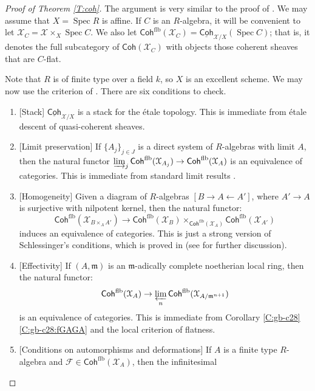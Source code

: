 \documentclass[a4paper]{amsart}
\theoremstyle{plain}
\theoremstyle{definition}
\theoremstyle{remark}
\numberwithin{equation}{section}
\newcommand\cX{\mathcal{X}}
\newcommand\Coh{\mathsf{Coh}}
\DeclareMathOperator{\Spec}{Spec}
\newcommand{\itemref}[1]{\eqref{#1}}
\newcommand{\shv}[1]{\mathcal{{#1}}}
\begin{document}
\begin{proof} [Proof of Theorem \ref{T:coh}]
  The argument is very similar to the proof of
  \cite[Thm.~8.1]{hallj_openness_coh}. We may assume that $X=\Spec R$
  is affine. If $C$ is an $R$-algebra, it will be convenient to let
  $\cX_C = \cX\times_X \Spec C$. We also let
  $\Coh^{\mathrm{flb}}(\cX_C)=\underline{\Coh}_{\cX/X}(\Spec C)$;
  that is, it denotes the full subcategory of $\Coh(\cX_C)$ with
  objects those coherent sheaves that are $C$-flat.

  Note that $R$ is of finite type over a field $k$, so $X$ is an
  excellent scheme.  We may now use the criterion of
  \cite[Thm.~A]{hallj_openness_coh}. There are six conditions to
  check.
  \begin{enumerate}
  \item {[Stack]} $\underline{\Coh}_{\cX/X}$ is a stack for the \'etale
    topology. This is immediate from \'etale descent of quasi-coherent
    sheaves.
  \item {[Limit preservation]} If $\{A_j\}_{j\in J}$ is a direct system
    of $R$-algebras with limit $A$, then the natural functor
    $\varinjlim_j \Coh^{\mathrm{flb}}(\cX_{A_j}) \to
    \Coh^{\mathrm{flb}}(\cX_A)$ is an equivalence of
    categories. This is immediate from standard limit results \cite[\S\S IV.8, IV.11]{EGA}. 
  \item {[Homogeneity]} Given a diagram of $R$-algebras
    $[B \to A \leftarrow A']$, where $A' \to A$ is surjective with
    nilpotent kernel, then the natural functor:
    \[
      \Coh^{\mathrm{flb}}(\cX_{B \times_A A'}) \to {\Coh}^{\mathrm{flb}}(\cX_B) \times_{{\Coh}^{\mathrm{flb}}(\cX_A)}\Coh^{\mathrm{flb}}(\cX_{A'})
    \]
    induces an equivalence of categories. This is just a strong version of Schlessinger's
    conditions, which is proved in \cite[Lem.~8.3]{hallj_openness_coh}
    (see \cite[p.~166]{hallj_openness_coh} for further discussion).
  \item {[Effectivity]} If $(A,\mathfrak{m})$ is an
    $\mathfrak{m}$-adically complete noetherian local ring, then the natural functor:
    \[
      \Coh^{\mathrm{flb}}(\cX_A) \to \varprojlim_n \Coh^{\mathrm{flb}}(\cX_{A/\mathfrak{m}^{n+1}})
    \]
    is an equivalence of categories. This is immediate from Corollary \ref{C:gb-c28}\itemref{C:gb-c28:fGAGA} and the local criterion of flatness. 
  \item {[Conditions on automorphisms and deformations]} If $A$ is a
    finite type $R$-algebra and
    $\shv{F} \in \Coh^{\mathrm{flb}}(\cX_A)$, then the infinitesimal

\end{enumerate}
\end{proof}
\end{document}
